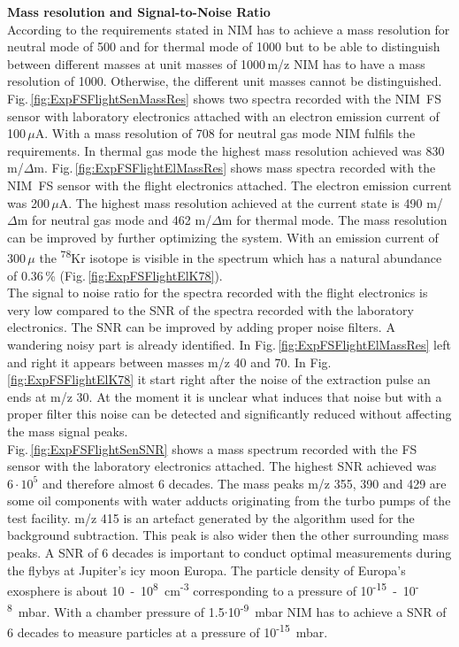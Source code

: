 		\textbf{Mass resolution and Signal-to-Noise Ratio}\\
		According to the requirements stated in \cite{red_book} NIM has to achieve a mass resolution for neutral mode of 500 and for thermal mode of 1000 but to be able to distinguish between different masses at unit masses of 1000\,m/z NIM has to have a mass resolution of 1000. Otherwise, the different unit masses cannot be distinguished.\\
		Fig.\,\ref{fig:ExpFSFlightSenMassRes} shows two spectra recorded with the NIM~FS sensor with laboratory electronics attached with an electron emission current of 100\,$\mu$A. With a mass resolution of 708 for neutral gas mode NIM fulfils the requirements. In thermal gas mode the highest mass resolution achieved was 830 m/$\Delta$m. Fig.\,\ref{fig:ExpFSFlightElMassRes} shows mass spectra recorded with the NIM~FS sensor with the flight electronics attached. The electron emission current was 200\,$\mu$A. The highest mass resolution achieved at the current state is 490 m/$\Delta$m for neutral gas mode and 462 m/$\Delta$m for thermal mode. The mass resolution can be improved by further optimizing the system. With an emission current of 300\,$\mu$ the \textsuperscript{78}Kr isotope is visible in the spectrum which has a natural abundance of 0.36\,\% (Fig.\,\ref{fig:ExpFSFlightElK78}).\\
		The signal to noise ratio for the spectra recorded with the flight electronics is very low compared to the SNR of the spectra recorded with the laboratory electronics. The SNR can be improved by adding proper noise filters.	A wandering noisy part is already identified. In Fig.\,\ref{fig:ExpFSFlightElMassRes} left and right it appears between masses m/z 40 and 70. In Fig.\,\ref{fig:ExpFSFlightElK78} it start right after the noise of the extraction pulse an ends at m/z 30. At the moment it is unclear what induces that noise but with a proper filter this noise can be detected and significantly reduced without affecting the mass signal peaks.\\
		Fig.\,\ref{fig:ExpFSFlightSenSNR} shows a mass spectrum recorded with the FS sensor with the laboratory electronics attached. The highest SNR achieved was $6\cdot10^{5}$ and therefore almost 6 decades. The mass peaks m/z 355, 390 and 429 are some oil components with water adducts originating from the turbo pumps of the test facility. m/z 415 is an artefact generated by the algorithm used for the background subtraction. This peak is also wider then the other surrounding mass peaks.
		A SNR of 6 decades is important to conduct optimal measurements during the flybys at Jupiter's icy moon Europa. The particle density of Europa's exosphere is about 10~-~10\textsuperscript{8}~cm\textsuperscript{-3} \cite{Vorburger_2018} corresponding to a pressure of 10\textsuperscript{-15}~-~10\textsuperscript{-8}~mbar. With a chamber pressure of 1.5$\cdot$10\textsuperscript{-9}~mbar NIM has to achieve a SNR of 6 decades to measure particles at a pressure of 10\textsuperscript{-15}~mbar.
